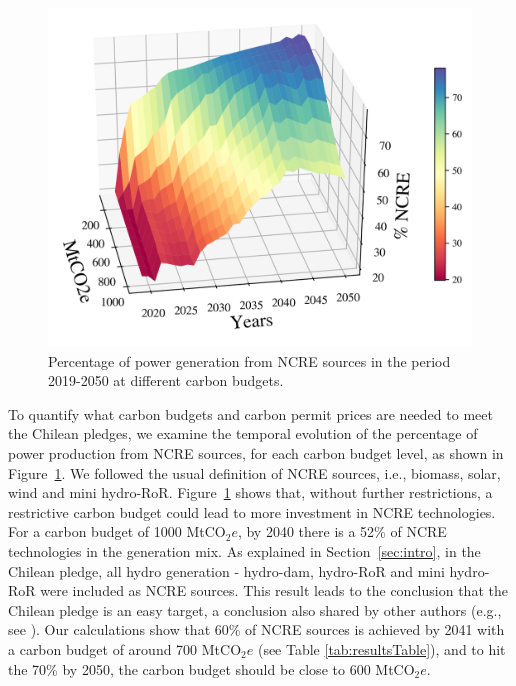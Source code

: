 \documentclass[11pt, letterpaper]{article}
\begin{document}
\smallskip

\begin{figure}[ht!]
\centering
 \includegraphics[width=4.5in]{draft_paper/Figures/figure4.png}
 \caption{Percentage of power generation from NCRE sources in the period 2019-2050 at different carbon budgets. }
  \label{fig:ernc_percent_cap}
  \end{figure}
  
To quantify what carbon budgets and carbon permit prices are needed to meet the Chilean pledges, we examine the temporal evolution of the percentage of power production from NCRE sources, for each carbon budget level, as shown in Figure~\ref{fig:ernc_percent_cap}. We followed the usual definition of NCRE sources, i.e., biomass, solar, wind and mini hydro-RoR. Figure~\ref{fig:ernc_percent_cap} shows that, without further restrictions, a restrictive carbon budget could lead to more investment in NCRE technologies. For a carbon budget of 1000 MtCO$_2e$, by 2040 there is a 52\% of NCRE technologies in the generation mix. As explained in Section~\ref{sec:intro}, in the Chilean pledge, all hydro generation - hydro-dam, hydro-RoR and mini hydro-RoR were included as NCRE sources. This result leads to the conclusion that the Chilean pledge is an easy target, a conclusion also shared by other authors (e.g., see \cite{munoz2017aiming}). Our calculations show that 60\% of NCRE sources is achieved by 2041 with a carbon budget of around 700 MtCO$_2e$ (see Table \ref{tab:resultsTable}), and to hit the 70\% by 2050, the carbon budget should be close to 600 MtCO$_2e$.
\end{document}
